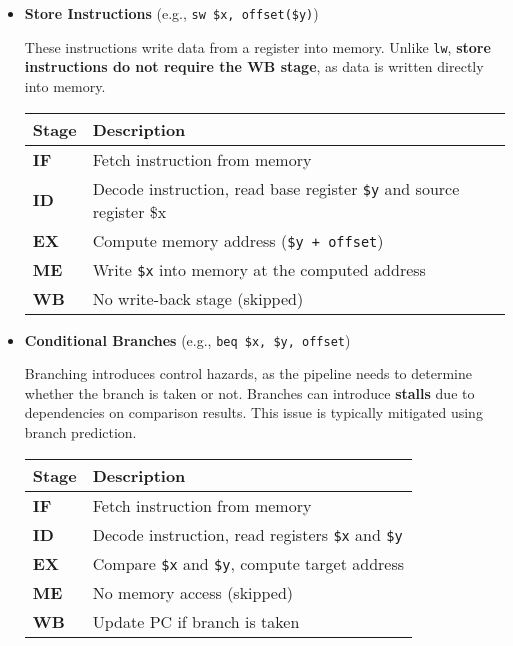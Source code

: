 \begin{itemize}
   \item \textbf{Store Instructions} (e.g., \texttt{sw \$x, offset(\$y)})
   
   These instructions write data from a register into memory. Unlike \texttt{lw}, \textbf{store instructions do not require the WB stage}, as data is written directly into memory.

   \begin{table}[!htp]
      \centering
      \begin{tabular}{@{} l l @{}}
         \toprule
         \textbf{Stage} & \textbf{Description} \\
         \midrule
         \textbf{IF} & Fetch instruction from memory \\ [.3em]
         \textbf{ID} & Decode instruction, read base register \texttt{\$y} and source register \$x \\ [.3em]
         \textbf{EX} & Compute memory address (\texttt{\$y + offset}) \\ [.3em]
         \textbf{ME} & Write \texttt{\$x} into memory at the computed address \\ [.3em]
         \textbf{WB} & No write-back stage (skipped) \\
         \bottomrule
      \end{tabular}
   \end{table}


   \newpage


   \item \textbf{Conditional Branches} (e.g., \texttt{beq \$x, \$y, offset})
   
   Branching introduces control hazards, as the pipeline needs to determine whether the branch is taken or not. Branches can introduce \textbf{stalls} due to dependencies on comparison results. This issue is typically mitigated using branch prediction.

   \begin{table}[!htp]
      \centering
      \begin{tabular}{@{} l l @{}}
         \toprule
         \textbf{Stage} & \textbf{Description} \\
         \midrule
         \textbf{IF} & Fetch instruction from memory \\ [.3em]
         \textbf{ID} & Decode instruction, read registers \texttt{\$x} and \texttt{\$y} \\ [.3em]
         \textbf{EX} & Compare \texttt{\$x} and \texttt{\$y}, compute target address \\ [.3em]
         \textbf{ME} & No memory access (skipped) \\ [.3em]
         \textbf{WB} & Update PC if branch is taken \\ [.3em]
         \bottomrule
      \end{tabular}
   \end{table}
\end{itemize}


